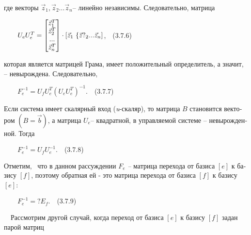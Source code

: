 \documentclass[a4paper]{article}
\newcommand\normalsubformula[1]{\text{\mathversion{normal}$#1$}}
\begin{document}
{\begin{russian}\sffamily
где векторы  $\vec z_1,\vec z_2...\vec z_n$– линейно независимы. Следовательно, матрица
\end{russian}}

{\begin{russian}\sffamily
\ \ \ \  $U_eU_e^T=\left[\begin{matrix}\vec z_1^T\\\vec z_2^T\\...\\\vec z_n^T\end{matrix}\right]\cdot \left[\vec
z_1\text{   \{}\vec{\normalsubformula z}?_2...\vec z_n\right]$,\ \ (3.7.6)
\end{russian}}

{\begin{russian}\sffamily
которая является матрицей Грама, имеет положительный определитель, а значит, – невырождена. Следовательно,
\end{russian}}

{\begin{russian}\sffamily
\ \ \ \  $F_e^{-1}=U_fU_e^T(U_eU_e^T)^{-1}$.\ \ (3.7.7)
\end{russian}}

{\begin{russian}\sffamily
Если система имеет скалярный вход (\textit{u}-скаляр), то матрица  $B$ ста­новится вектором  $(B=\vec b)$, а матрица 
$U_e$– квадратной, в управляемой системе – невырожденной. Тогда
\end{russian}}

{\begin{russian}\sffamily
\ \ \ \  $F_e^{-1}=U_fU_e^{-1}$.\ \ (3.7.8)
\end{russian}}

{\begin{russian}\sffamily
Отметим, \ что в данном рассуждении  $F_e$\textit{ – }матрица перехода от базиса  $[e]$ к базису  $[f]$, поэтому
обратная ей - это матрица перехода от базиса  $[f]$ к базису  $[e]$:
\end{russian}}

{\begin{russian}\sffamily
\ \ \ \  $F_e^{-1}=?E_f$.\ \ (3.7.9)
\end{russian}}

{\begin{russian}\sffamily
\ \ Рассмотрим другой случай, когда переход от базиса  $[e]$ к базису  $[f]$ задан парой матриц
\end{russian}}
\end{document}
